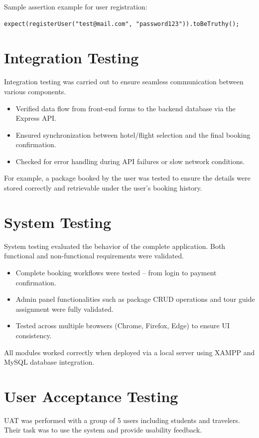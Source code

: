 Sample assertion example for user registration:
\begin{verbatim}
expect(registerUser("test@mail.com", "password123")).toBeTruthy();
\end{verbatim}

\section{Integration Testing}
Integration testing was carried out to ensure seamless communication between various components.

\begin{itemize}
    \item Verified data flow from front-end forms to the backend database via the Express API.
    \item Ensured synchronization between hotel/flight selection and the final booking confirmation.
    \item Checked for error handling during API failures or slow network conditions.
\end{itemize}

For example, a package booked by the user was tested to ensure the details were stored correctly and retrievable under the user's booking history.

\section{System Testing}
System testing evaluated the behavior of the complete application. Both functional and non-functional requirements were validated.

\begin{itemize}
    \item Complete booking workflows were tested – from login to payment confirmation.
    \item Admin panel functionalities such as package CRUD operations and tour guide assignment were fully validated.
    \item Tested across multiple browsers (Chrome, Firefox, Edge) to ensure UI consistency.
\end{itemize}

All modules worked correctly when deployed via a local server using XAMPP and MySQL database integration.

\section{User Acceptance Testing}
UAT was performed with a group of 5 users including students and travelers. Their task was to use the system and provide usability feedback.

